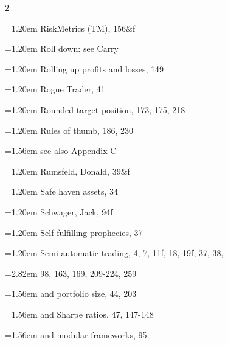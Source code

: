 {\begin{multicols}{2}
\par \noindent\hangindent=1.20em\hspace*{0.00em} RiskMetrics (TM), 156\&f
\par \noindent\hangindent=1.20em\hspace*{0.00em} Roll down: see Carry
\par \noindent\hangindent=1.20em\hspace*{0.00em} Rolling up profits and losses, 149
\par \noindent\hangindent=1.20em\hspace*{0.00em} Rogue Trader, 41
\par \noindent\hangindent=1.20em\hspace*{0.00em} Rounded target position, 173, 175, 218
\par \noindent\hangindent=1.20em\hspace*{0.00em} Rules of thumb, 186, 230
\par \noindent\hangindent=1.56em\hspace*{0.36em} see also Appendix C
\par \noindent\hangindent=1.20em\hspace*{0.00em} Rumsfeld, Donald, 39\&f
\par \noindent\hangindent=1.20em\hspace*{0.00em} Safe haven assets, 34
\par \noindent\hangindent=1.20em\hspace*{0.00em} Schwager, Jack, 94f
\par \noindent\hangindent=1.20em\hspace*{0.00em} Self-fulfilling prophecies, 37
\par \noindent\hangindent=1.20em\hspace*{0.00em} Semi-automatic trading, 4, 7, 11f, 18, 19f, 37, 38,
\par \noindent\hangindent=2.82em\hspace*{1.62em} 98, 163, 169, 209-224, 259
\par \noindent\hangindent=1.56em\hspace*{0.36em} and portfolio size, 44, 203
\par \noindent\hangindent=1.56em\hspace*{0.36em} and Sharpe ratios, 47, 147-148
\par \noindent\hangindent=1.56em\hspace*{0.36em} and modular frameworks, 95

\end{multicols}}
